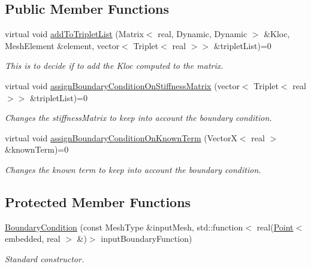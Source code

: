\subsection*{Public Member Functions}
\begin{DoxyCompactItemize}
\item 
virtual void \hyperlink{class_boundary_condition_aba7cce27bd46f51026701a11ddca04f8}{add\+To\+Triplet\+List} (Matrix$<$ real, Dynamic, Dynamic $>$ \&Kloc, Mesh\+Element \&element, vector$<$ Triplet$<$ real $>$$>$ \&triplet\+List)=0
\begin{DoxyCompactList}\small\item\em This is to decide if to add the Kloc computed to the matrix. \end{DoxyCompactList}\item 
virtual void \hyperlink{class_boundary_condition_a19b5c27271977f40146d867ff281ad24}{assign\+Boundary\+Condition\+On\+Stiffness\+Matrix} (vector$<$ Triplet$<$ real $>$$>$ \&triplet\+List)=0\hypertarget{class_boundary_condition_a19b5c27271977f40146d867ff281ad24}{}\label{class_boundary_condition_a19b5c27271977f40146d867ff281ad24}

\begin{DoxyCompactList}\small\item\em Changes the stiffness\+Matrix to keep into account the boundary condition. \end{DoxyCompactList}\item 
virtual void \hyperlink{class_boundary_condition_a6bec19c145f0cae03d30cb2c2ea80594}{assign\+Boundary\+Condition\+On\+Known\+Term} (VectorX$<$ real $>$ \&known\+Term)=0\hypertarget{class_boundary_condition_a6bec19c145f0cae03d30cb2c2ea80594}{}\label{class_boundary_condition_a6bec19c145f0cae03d30cb2c2ea80594}

\begin{DoxyCompactList}\small\item\em Changes the known term to keep into account the boundary condition. \end{DoxyCompactList}\end{DoxyCompactItemize}
\subsection*{Protected Member Functions}
\begin{DoxyCompactItemize}
\item 
\hyperlink{class_boundary_condition_a93813e79c791932c9e10eb919e0ec371}{Boundary\+Condition} (const Mesh\+Type \&input\+Mesh, std\+::function$<$ real(\hyperlink{class_point}{Point}$<$ embedded, real $>$ \&)$>$ input\+Boundary\+Function)\hypertarget{class_boundary_condition_a93813e79c791932c9e10eb919e0ec371}{}\label{class_boundary_condition_a93813e79c791932c9e10eb919e0ec371}

\begin{DoxyCompactList}\small\item\em Standard constructor. \end{DoxyCompactList}\end{DoxyCompactItemize}
